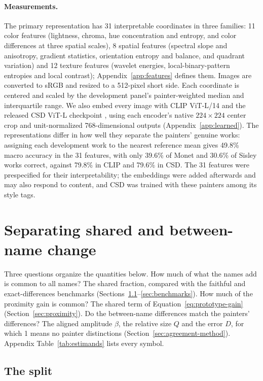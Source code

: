 \documentclass[10pt]{article}
\begin{document}
\paragraph{Measurements.}
The primary representation has 31 interpretable coordinates in three families: 11 color features
(lightness, chroma, hue concentration and entropy, and color differences at three spatial
scales), 8 spatial features (spectral slope and anisotropy, gradient statistics, orientation
entropy and balance, and quadrant variation) and 12 texture features (wavelet energies,
local-binary-pattern entropies and local contrast); Appendix~\ref{app:features} defines them.
Images are converted to sRGB and resized to a 512-pixel short side. Each coordinate is centered
and scaled by the development panel's painter-weighted median and interquartile range. We also
embed every image with CLIP ViT-L/14 \citep{radford2021} and the released CSD ViT-L checkpoint
\citep{somepalli2024style}, using each encoder's native $224\times224$ center crop and
unit-normalized 768-dimensional outputs (Appendix~\ref{app:learned}). The representations differ
in how well they separate the painters' genuine works: assigning each development work to the
nearest reference mean gives 49.8\% macro accuracy in the 31 features, with only 39.6\% of Monet
and 30.6\% of Sisley works correct, against 79.8\% in CLIP and 79.6\% in CSD. The 31 features
were prespecified for their interpretability; the embeddings were added afterwards and may also
respond to content, and CSD was trained with these painters among its style tags.

\section{Separating shared and between-name change}\label{sec:method}

Three questions organize the quantities below. How much of what the names add is common to all
names? The shared fraction, compared with the faithful and exact-differences benchmarks
(Sections~\ref{sec:split}--\ref{sec:benchmarks}). How much of the proximity gain is common? The
shared term of Equation~\ref{eq:prototype-gain} (Section~\ref{sec:proximity}). Do the
between-name differences match the painters' differences? The aligned amplitude $\beta$, the
relative size $Q$ and the error $D$, for which 1 means no painter distinctions
(Section~\ref{sec:agreement-method}). Appendix Table~\ref{tab:estimands} lists every symbol.

\subsection{The split}\label{sec:split}
\end{document}
